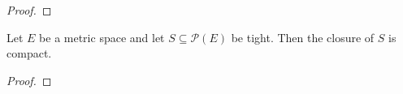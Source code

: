 \begin{proof}
\end{proof}

\begin{lemma}\label{lem:relatively_compact_of_tight}
Let $E$ be a metric space and let $S \subseteq \mathcal P(E)$ be tight. Then the closure of $S$ is compact.
\end{lemma}

\begin{proof}
\end{proof}
